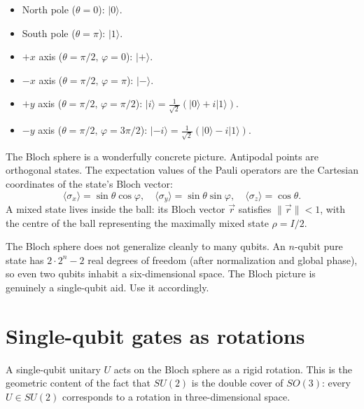\begin{itemize}
  \item North pole ($\theta=0$): $|0\rangle$.
  \item South pole ($\theta=\pi$): $|1\rangle$.
  \item $+x$ axis ($\theta=\pi/2,\,\varphi=0$): $|+\rangle$.
  \item $-x$ axis ($\theta=\pi/2,\,\varphi=\pi$): $|-\rangle$.
  \item $+y$ axis ($\theta=\pi/2,\,\varphi=\pi/2$): $|i\rangle = \tfrac{1}{\sqrt 2}(|0\rangle+i|1\rangle)$.
  \item $-y$ axis ($\theta=\pi/2,\,\varphi=3\pi/2$): $|-i\rangle = \tfrac{1}{\sqrt 2}(|0\rangle-i|1\rangle)$.
\end{itemize}

The Bloch sphere is a wonderfully concrete picture. Antipodal points are orthogonal states. The expectation values of the Pauli operators are the Cartesian coordinates of the state's Bloch vector:
\[
  \langle\sigma_x\rangle = \sin\theta\cos\varphi, \quad
  \langle\sigma_y\rangle = \sin\theta\sin\varphi, \quad
  \langle\sigma_z\rangle = \cos\theta.
\]
A mixed state lives inside the ball: its Bloch vector $\vec r$ satisfies $\|\vec r\| < 1$, with the centre of the ball representing the maximally mixed state $\rho = I/2$.

\begin{remark}
The Bloch sphere does not generalize cleanly to many qubits. An $n$-qubit pure state has $2\cdot 2^n - 2$ real degrees of freedom (after normalization and global phase), so even two qubits inhabit a six-dimensional space. The Bloch picture is genuinely a single-qubit aid. Use it accordingly.
\end{remark}

\section{Single-qubit gates as rotations}

A single-qubit unitary $U$ acts on the Bloch sphere as a rigid rotation. This is the geometric content of the fact that $SU(2)$ is the double cover of $SO(3)$: every $U \in SU(2)$ corresponds to a rotation in three-dimensional space.

